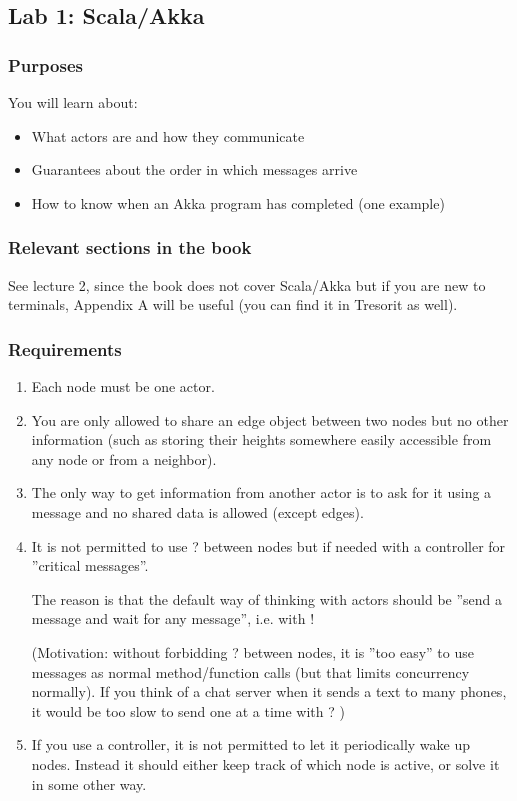\documentclass{forsete}
\begin{document}
\newpage
\subsection*{Lab 1: Scala/Akka}
\subsubsection*{Purposes}
You will learn about:
\begin{itemize}
\item What actors are and how they communicate
\item Guarantees about the order in which messages arrive
\item How to know when an Akka program has completed (one example)
\end{itemize}
\subsubsection*{Relevant sections in the book}
See lecture 2, since the book does not cover Scala/Akka but if you are new to terminals, Appendix A will be useful (you can find it in Tresorit as well).
\subsubsection*{Requirements}
\begin{enumerate}
\item Each node must be one actor.
\item You are only allowed to share an edge object between two nodes but no other information (such as storing their
heights somewhere easily accessible from any node or from a neighbor).
\item The only way to get information from another actor is to ask for it using a message and no shared data is allowed (except edges).
\item It is not permitted to use ? between nodes but if needed with a controller for 
''critical messages''.

The reason is that the default way of thinking with actors should be ''send a message and wait for any message'', i.e. with !

(Motivation: without forbidding ? between nodes, it is ''too easy'' to use messages as normal method/function calls (but that limits concurrency normally).
If you think of a chat server when it sends a text to many phones, it would be too slow to send one at a time with ?
)

\item If you use a controller, it is not permitted to let it periodically wake up nodes. Instead it should either keep 
track of which node is active, or solve it in some other way.
\end{enumerate}
\end{document}
